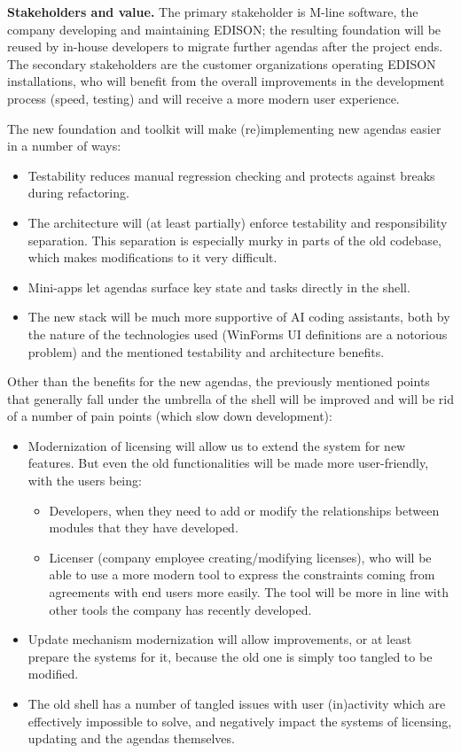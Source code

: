 \documentclass{article}
\begin{document}
\medskip
\noindent \textbf{Stakeholders and value.} The primary stakeholder is M-line software, the company developing and maintaining EDISON; the resulting foundation will be reused by in-house developers to migrate further agendas after the project ends. The secondary stakeholders are the customer organizations operating EDISON installations, who will benefit from the overall improvements in the development process (speed, testing) and will receive a more modern user experience.

\medskip
\noindent The new foundation and toolkit will make (re)implementing new agendas easier in a number of ways:
\begin{itemize}
    \item Testability reduces manual regression checking and protects against breaks during refactoring.
    \item The architecture will (at least partially) enforce testability and responsibility separation. This separation is especially murky in parts of the old codebase, which makes modifications to it very difficult.
    \item Mini-apps let agendas surface key state and tasks directly in the shell.
    \item The new stack will be much more supportive of AI coding assistants, both by the nature of the technologies used (WinForms UI definitions are a notorious problem) and the mentioned testability and architecture benefits.
\end{itemize}

Other than the benefits for the new agendas, the previously mentioned points that generally fall under the umbrella of the shell will be improved and will be rid of a number of pain points (which slow down development):
\begin{itemize}
    \item Modernization of licensing will allow us to extend the system for new features. But even the old functionalities will be made more user-friendly, with the users being:
    \begin{itemize}
        \item Developers, when they need to add or modify the relationships between modules that they have developed.
        \item Licenser (company employee creating/modifying licenses), who will be able to use a more modern tool to express the constraints coming from agreements with end users more easily. The tool will be more in line with other tools the company has recently developed.
    \end{itemize}
    \item Update mechanism modernization will allow improvements, or at least prepare the systems for it, because the old one is simply too tangled to be modified.
    \item The old shell has a number of tangled issues with user (in)activity which are effectively impossible to solve, and negatively impact the systems of licensing, updating and the agendas themselves.
\end{itemize}
\end{document}
